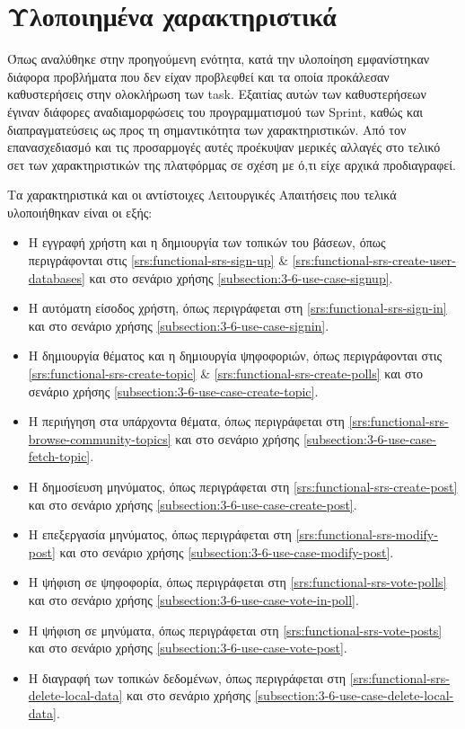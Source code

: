 \section{Υλοποιημένα χαρακτηριστικά} \label{section:4-5-implemented-parts}

Όπως αναλύθηκε στην προηγούμενη ενότητα, κατά την υλοποίηση εμφανίστηκαν διάφορα προβλήματα που δεν είχαν προβλεφθεί και τα οποία προκάλεσαν καθυστερήσεις στην ολοκλήρωση των task. Εξαιτίας αυτών των καθυστερήσεων έγιναν διάφορες αναδιαμορφώσεις του προγραμματισμού των Sprint, καθώς και διαπραγματεύσεις ως προς τη σημαντικότητα των χαρακτηριστικών. Από τον επανασχεδιασμό και τις προσαρμογές αυτές προέκυψαν μερικές αλλαγές στο τελικό σετ των χαρακτηριστικών της πλατφόρμας σε σχέση με ό,τι είχε αρχικά προδιαγραφεί.

Τα χαρακτηριστικά και οι αντίστοιχες Λειτουργικές Απαιτήσεις που τελικά υλοποιήθηκαν είναι οι εξής:

\begin{itemize}
    \item Η εγγραφή χρήστη και η δημιουργία των τοπικών του βάσεων, όπως περιγράφονται στις \ref{srs:functional-srs-sign-up} \& \ref{srs:functional-srs-create-user-databases} και στο σενάριο χρήσης \ref{subsection:3-6-use-case-signup}.
    \item Η αυτόματη είσοδος χρήστη, όπως περιγράφεται στη \ref{srs:functional-srs-sign-in} και στο σενάριο χρήσης \ref{subsection:3-6-use-case-signin}.
    \item Η δημιουργία θέματος και η δημιουργία ψηφοφοριών, όπως περιγράφονται στις \ref{srs:functional-srs-create-topic} \& \ref{srs:functional-srs-create-polls} και στο σενάριο χρήσης \ref{subsection:3-6-use-case-create-topic}.
    \item Η περιήγηση στα υπάρχοντα θέματα, όπως περιγράφεται στη \ref{srs:functional-srs-browse-community-topics} και στο σενάριο χρήσης \ref{subsection:3-6-use-case-fetch-topic}.
    \item Η δημοσίευση μηνύματος, όπως περιγράφεται στη \ref{srs:functional-srs-create-post} και στο σενάριο χρήσης \ref{subsection:3-6-use-case-create-post}.
    \item Η επεξεργασία μηνύματος, όπως περιγράφεται στη \ref{srs:functional-srs-modify-post} και στο σενάριο χρήσης \ref{subsection:3-6-use-case-modify-post}.
    \item Η ψήφιση σε ψηφοφορία, όπως περιγράφεται στη \ref{srs:functional-srs-vote-polls} και στο σενάριο χρήσης \ref{subsection:3-6-use-case-vote-in-poll}.
    \item Η ψήφιση σε μηνύματα, όπως περιγράφεται στη \ref{srs:functional-srs-vote-posts} και στο σενάριο χρήσης \ref{subsection:3-6-use-case-vote-post}.
    \item Η διαγραφή των τοπικών δεδομένων, όπως περιγράφεται στη \ref{srs:functional-srs-delete-local-data} και στο σενάριο χρήσης \ref{subsection:3-6-use-case-delete-local-data}.
\end{itemize}

